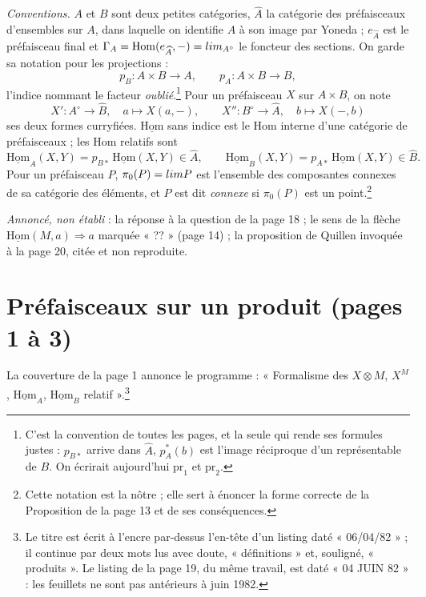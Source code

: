 \documentclass[11pt,a4paper]{article}
\begin{document}
\emph{Conventions.} $A$ et $B$ sont deux petites catégories, $\widehat{A}$ la
catégorie des préfaisceaux d'ensembles sur $A$, dans laquelle on identifie $A$
à son image par Yoneda ; $e_{\widehat{A}}$ est le préfaisceau final et
$\Gamma_{A} = \mathrm{Hom}(e_{\widehat{A}}, -) = \varprojlim_{A^{\circ}}$ le
foncteur des sections. On garde sa notation pour les projections :
\[
p_{B} : A \times B \to A, \qquad p_{A} : A \times B \to B,
\]
l'indice nommant le facteur \emph{oublié}.\footnote{C'est la convention de
toutes les pages, et la seule qui rende ses formules justes : $p_{B*}$ arrive
dans $\widehat{A}$, $p_{A}^{*}(b)$ est l'image réciproque d'un représentable de
$B$. On écrirait aujourd'hui $\mathrm{pr}_{1}$ et $\mathrm{pr}_{2}$.} Pour un
préfaisceau $X$ sur $A \times B$, on note
\[
X' : A^{\circ} \to \widehat{B}, \quad a \mapsto X(a, -), \qquad
X'' : B^{\circ} \to \widehat{A}, \quad b \mapsto X(-, b)
\]
ses deux formes curryfiées. $\underline{\mathrm{Hom}}$ sans indice est le Hom
interne d'une catégorie de préfaisceaux ; les Hom relatifs sont
\[
\underline{\mathrm{Hom}}_{A}(X, Y) = p_{B*}\, \underline{\mathrm{Hom}}(X, Y)
\in \widehat{A}, \qquad
\underline{\mathrm{Hom}}_{B}(X, Y) = p_{A*}\, \underline{\mathrm{Hom}}(X, Y)
\in \widehat{B}.
\]
Pour un préfaisceau $P$, $\pi_{0}(P) = \varinjlim P$ est l'ensemble des
composantes connexes de sa catégorie des éléments, et $P$ est dit
\emph{connexe} si $\pi_{0}(P)$ est un point.\footnote{Cette notation est la
nôtre ; elle sert à énoncer la forme correcte de la Proposition de la page 13
et de ses conséquences.}

\emph{Annoncé, non établi} : la réponse à la question
de la page 18 ; le sens de la flèche $\underline{\mathrm{Hom}}(M, a)
\Rightarrow a$ marquée « ?? » (page 14) ; la proposition de Quillen invoquée
à la page 20, citée et non reproduite.

\section*{Préfaisceaux sur un produit (pages 1 à 3)}

La couverture de la page 1 annonce le programme : « Formalisme des
$X \otimes M$, $X^{M}$, $\underline{\mathrm{Hom}}_{A}$,
$\underline{\mathrm{Hom}}_{B}$ relatif ».\footnote{Le titre est écrit à
l'encre par-dessus l'en-tête d'un listing daté « 06/04/82 » ; il continue par
deux mots lus avec doute, « définitions » et, souligné, « produits ». Le
listing de la page 19, du même travail, est daté « 04 JUIN 82 » : les
feuillets ne sont pas antérieurs à juin 1982.}
\end{document}
